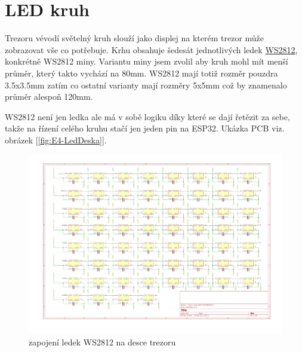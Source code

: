 \section{LED kruh}

Trezoru vévodí světelný kruh slouží jako displej na kterém trezor může zobrazovat vše co potřebuje. Krhu obsahuje šedesát jednotlivých ledek 
\href{https://cdn-shop.adafruit.com/datasheets/WS2812B.pdf}{WS2812}, konkrétně WS2812 miny. Variantu miny jsem zvolil aby kruh mohl mít menší
průměr, který takto vychází na 80mm. WS2812 mají totiž rozměr pouzdra 3.5x3.5mm zatím co ostatní varianty mají 
rozměry 5x5mm což by znamenalo průměr alespoň 120mm.

WS2812 není jen ledka ale má v sobě logiku díky které se dají řetězit za sebe, takže na řízení celého kruhu stačí jen jeden pin na ESP32.\newline
Ukázka PCB viz. obrázek [\ref{fig:E4-LedDeska}].
\begin{figure}[htbp]
    \centering
    \includegraphics[width=\textwidth]{kapitoly/obrazky/E4/WS2812/zapojeni_WS2812.pdf}
    \caption{zapojení ledek WS2812 na desce trezoru}
    \label{fig:E4-sch_civka_tercik}
\end{figure}

\newpage